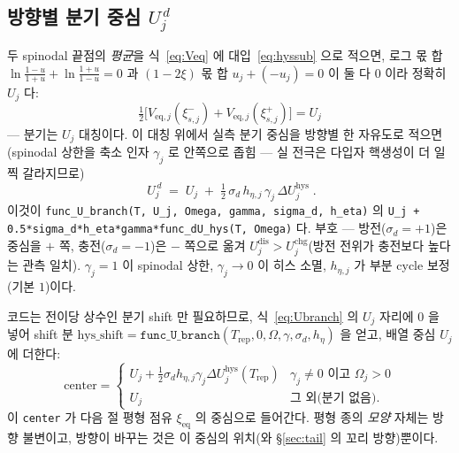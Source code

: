 \documentclass[11pt,a4paper]{article}
\newcommand{\eq}{\mathrm{eq}}
\newcommand{\dis}{\mathrm{dis}}
\newcommand{\chg}{\mathrm{chg}}
\newcommand{\hys}{\mathrm{hys}}
\newcommand{\rep}{\mathrm{rep}}
\newcommand{\code}[1]{\texttt{#1}}
\begin{document}
\subsection{방향별 분기 중심 $U_j^{\,d}$}
두 spinodal 끝점의 \emph{평균}을 식~\eqref{eq:Veq} 에 대입~\eqref{eq:hyssub} 으로 적으면, 로그 몫 합
$\ln\frac{1-u}{1+u}+\ln\frac{1+u}{1-u}=0$ 과 $(1-2\xi)$ 몫 합 $u_j+(-u_j)=0$ 이 둘 다 $0$ 이라 정확히 $U_j$ 다:
\begin{equation}
\tfrac12\big[V_{\eq,j}(\xi_{s,j}^-)+V_{\eq,j}(\xi_{s,j}^+)\big]=U_j
\label{eq:hyssym}
\end{equation}
— 분기는 $U_j$ 대칭이다. 이 대칭 위에서 실측 분기 중심을 방향별 한 자유도로 적으면(spinodal 상한을 축소 인자
$\gamma_j$ 로 안쪽으로 좁힘 — 실 전극은 다입자 핵생성이 더 일찍 갈라지므로)
\begin{equation}
\boxed{\;U_j^{\,d}\;=\;U_j\;+\;\tfrac12\,\sigma_d\,h_{\eta,j}\,\gamma_j\,\Delta U_j^\hys\;.}
\label{eq:Ubranch}
\end{equation}
이것이 \code{func\_U\_branch(T, U\_j, Omega, gamma, sigma\_d, h\_eta)} 의
\code{U\_j + 0.5*sigma\_d*h\_eta*gamma*func\_dU\_hys(T, Omega)} 다. 부호 — 방전($\sigma_d=+1$)은 중심을 $+$ 쪽,
충전($\sigma_d=-1$)은 $-$ 쪽으로 옮겨 $U_j^{\dis}>U_j^{\chg}$(방전 전위가 충전보다 높다는 관측 일치). $\gamma_j=1$ 이
spinodal 상한, $\gamma_j\to0$ 이 히스 소멸, $h_{\eta,j}$ 가 부분 cycle 보정(기본 $1$)이다.

코드는 전이당 상수인 분기 shift 만 필요하므로, 식~\eqref{eq:Ubranch} 의 $U_j$ 자리에 $0$ 을 넣어 shift 분
$\mathrm{hys\_shift}=\code{func\_U\_branch}(T_\rep,0,\Omega,\gamma,\sigma_d,h_\eta)$ 을 얻고, 배열 중심 $U_j$ 에 더한다:
\begin{equation}
\mathrm{center}=
\begin{cases}
U_j+\tfrac12\sigma_d h_{\eta,j}\gamma_j\Delta U_j^\hys(T_\rep) & \gamma_j\ne0 \text{ 이고 } \Omega_j>0\\[2pt]
U_j & \text{그 외(분기 없음)}.
\end{cases}
\label{eq:center}
\end{equation}
이 \code{center} 가 다음 절 평형 점유 $\xi_\eq$ 의 중심으로 들어간다. 평형 종의 \emph{모양} 자체는 방향 불변이고,
방향이 바꾸는 것은 이 중심의 위치(와 \S\ref{sec:tail} 의 꼬리 방향)뿐이다.
\end{document}
